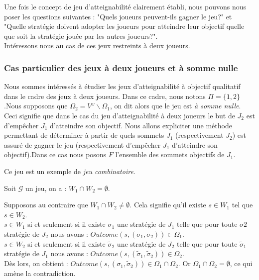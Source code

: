 	
	
	Une fois le concept de jeu d'atteignabilité clairement établi, nous pouvons nous poser les questions suivantes : "Quels joueurs peuvent-ils gagner le jeu?" et "Quelle stratégie doivent adopter les joueurs pour atteindre leur objectif quelle que soit la stratégie jouée par les autres joueurs?". \\
	
	Intéressons nous au cas de ces jeux restreints à deux joueurs.
	
	\subsubsection{Cas particulier des jeux à deux joueurs et à somme nulle}
	Nous sommes intéressés à étudier les jeux d'atteignabilité à objectif qualitatif dans le cadre des jeux à deux joueurs. Dans ce cadre, nous notons $\Pi = \{1,2\}$.Nous supposons que $\Omega _{2} = V^{\omega}\backslash \Omega _{1}$, on dit alors que le jeu est \textit{à somme nulle}. Ceci signifie que dans le cas du jeu d'atteignabilité à deux joueurs le but de $J_{2}$ est d'empêcher $J_{1}$ d'atteindre son objectif. Nous allons expliciter une méthode permettant de déterminer à partir de quels sommets $J_{1}$ (respectivement $J_{2}$) est assuré de gagner le jeu (respectivement d'empêcher $J_{1}$ d'atteindre son objectif).Dans ce cas nous posons $F$ l'ensemble des sommets objectifs de $J_{1}$.
	
	\begin{rem}
		Ce jeu est un exemple de \textit{jeu combinatoire}.
	\end{rem}

	\label{Wempty}
	\begin{propriete}
		Soit $\mathcal{G}$ un jeu, on a : $W_{1}\cap W_{2} = \emptyset$.
	\end{propriete}
	\begin{demonstration}
		Supposons au contraire que $W_{1}\cap W_{2} \neq \emptyset$. Cela signifie qu'il existe $s \in W_{1}$ tel que $s \in W_{2}$.\\
		$s \in W_{1}$ si et seulement si il existe $\sigma _{1}$ une stratégie de $J_{1}$ telle que pour toute $\sigma {2}$ stratégie de $J_{2}$ nous avons : $Outcome(s,(\sigma _{1},\sigma _{2})) \in \Omega _{1}$.\\
		$s \in W_{2}$ si et seulement si il existe $\tilde{\sigma} _{2}$ une stratégie de $J_{2}$ telle que pour toute $\tilde{\sigma}_{1}$ stratégie de $J_{1}$ nous avons : $Outcome(s,(\tilde{\sigma}_{1},\tilde{\sigma}_{2})) \in \Omega _{2}$.\\
		Dès lors, on obtient : $Outcome(s,(\sigma _{1},\tilde{\sigma}_{2})) \in \Omega _{1} \cap \Omega _{2}$. Or $\Omega _{1} \cap \Omega _{2} = \emptyset$, ce qui amène la contradiction.\\
	\end{demonstration}

